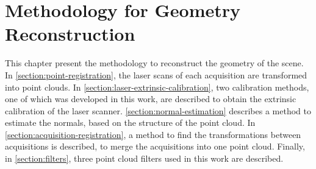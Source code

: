 \chapter{Methodology for Geometry Reconstruction}

This chapter present the methodology to reconstruct the geometry of the scene. In \cref{section:point-registration}, the laser scans of each acquisition are transformed into point clouds. In \cref{section:laser-extrinsic-calibration}, two calibration methods, one of which was developed in this work, are described to obtain the extrinsic calibration of the laser scanner. \cref{section:normal-estimation} describes a method to estimate the normals, based on the structure of the point cloud. In \cref{section:acquisition-registration}, a method to find the transformations between acquisitions is described, to merge the acquisitions into one point cloud. Finally, in \cref{section:filters}, three point cloud filters used in this work are described.






